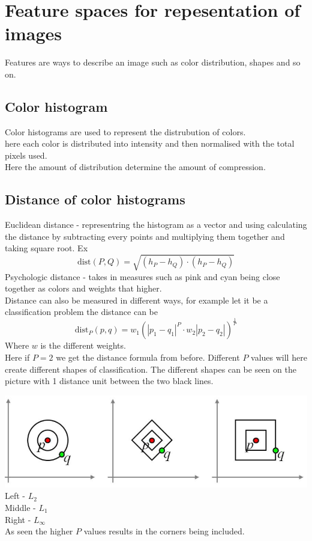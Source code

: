\documentclass[12pt, a4paper]{article}
\begin{document}
		\section{Feature spaces for repesentation of images}
			Features are ways to describe an image such as color distribution, shapes and so on.
			\subsection{Color histogram}
				Color histograms are used to represent the distrubution of colors.\\
				here each color is distributed into intensity and then normalised with the total pixels used.\\
				Here the amount of distribution determine the amount of compression.\\
			\subsection{Distance of color histograms}
				Euclidean distance - representring the histogram as a vector and using calculating the distance by subtracting every points and multiplying them together and taking square root. Ex $$\text{dist}(P,Q)=\sqrt{(h_P-h_Q)\cdot (h_P-h_Q)}$$
				Psychologic distance - takes in measures such as pink and cyan being close together as colors and weights that higher.\\
				Distance can also be measured in different ways, for example let it be a classification problem the distance can be  $$\text{dist}_P(p,q)=w_1(|p_1-q_1|^P\cdot w_2|p_2-q_2|)^{\frac{1}{P}}$$ Where $w$ is the different weights.\\
				Here if $P=2$ we get the distance formula from before. Different $P$ values will here create different shapes of classification. The different shapes can be seen on the picture with 1 distance unit between the two black lines.\\
				\begin{center}
					\includegraphics[width=\textwidth]{assets/distanceFormula.png}\\
					Left - $L_2$ \\
					Middle - $L_1$\\
					Right - $L_{\infty}$\\
					As seen the higher $P$ values results in the corners being included.
				\end{center}
				
\end{document}
